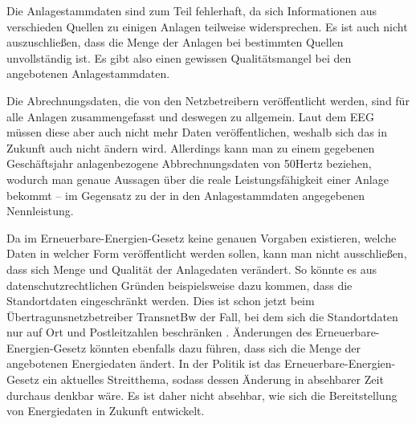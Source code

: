 \documentclass[a4paper,11pt]{article}
\begin{document}
Die Anlagestammdaten sind zum Teil fehlerhaft, da sich Informationen aus
verschieden Quellen zu einigen Anlagen teilweise widersprechen. Es ist auch
nicht auszuschließen, dass die Menge der Anlagen bei bestimmten Quellen
unvollständig ist. Es gibt also einen gewissen Qualitätsmangel bei den
angebotenen Anlagestammdaten. 

Die Abrechnungsdaten, die von den Netzbetreibern veröffentlicht werden, sind
für alle Anlagen zusammengefasst und deswegen zu allgemein. Laut dem EEG
müssen diese aber auch nicht mehr Daten veröffentlichen, weshalb sich das in
Zukunft auch nicht ändern wird. Allerdings kann man zu einem gegebenen
Geschäftsjahr anlagenbezogene Abbrechnungsdaten von 50Hertz beziehen, wodurch
man genaue Aussagen über die reale Leistungsfähigkeit einer Anlage bekommt --
im Gegensatz zu der in den Anlagestammdaten angegebenen Nennleistung.
 
Da im Erneuerbare-Energien-Gesetz keine genauen Vorgaben existieren, welche
Daten in welcher Form veröffentlicht werden sollen, kann man nicht
ausschließen, dass sich Menge und Qualität der Anlagedaten verändert. So
könnte es aus datenschutzrechtlichen Gründen beispielsweise dazu kommen, dass
die Standortdaten eingeschränkt werden. Dies ist schon jetzt beim
Übertragunsnetzbetreiber TransnetBw der Fall, bei dem sich die Standortdaten
nur auf Ort und Postleitzahlen beschränken \cite{transnetbw}. Änderungen des
Erneuerbare-Energien-Gesetz könnten ebenfalls dazu führen, dass sich die Menge
der angebotenen Energiedaten ändert. In der Politik ist das
Erneuerbare-Energien-Gesetz ein aktuelles Streitthema, sodass dessen Änderung
in absehbarer Zeit durchaus denkbar wäre. Es ist daher nicht absehbar, wie
sich die Bereitstellung von Energiedaten in Zukunft entwickelt.
\end{document}

